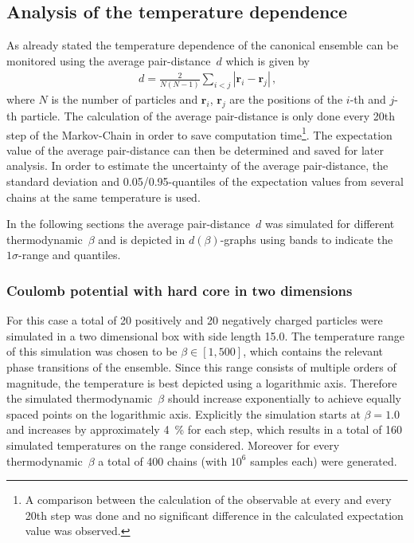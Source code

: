 \documentclass[11pt, a4paper]{article}
\numberwithin{equation}{section}
\begin{document}
\subsection{Analysis of the temperature dependence} \label{sec:Temp_Dep}
As already stated the temperature dependence of the canonical ensemble can be monitored using the average pair-distance~$d$ which is given by
\begin{align*}
d = \frac{2}{N(N - 1)} \sum_{i<j} |\mathbf{r}_i - \mathbf{r}_j | \, \text{,}
\end{align*}
where $N$ is the number of particles and $\mathbf{r}_i$, $\mathbf{r}_j$ are the positions of the $i$-th and $j$-th particle.
The calculation of the average pair-distance is only done every 20th step of the Markov-Chain in order to save computation time\footnote{A comparison between the calculation of the observable at every and every 20th step was done and no significant difference in the calculated expectation value was observed.}.
The expectation value of the average pair-distance can then be determined and saved for later analysis.
In order to estimate the uncertainty of the average pair-distance, the standard deviation and 0.05/0.95-quantiles of the expectation values from several chains at the same temperature is used.

In the following sections the average pair-distance~$d$ was simulated for different thermodynamic~$\beta$ and is depicted in $d(\beta)$-graphs using bands to indicate the $1\sigma$-range and quantiles.

\subsubsection{Coulomb potential with hard core in two dimensions} \label{sec:2d_coulomb_tempdep}
For this case a total of 20 positively and 20 negatively charged particles were simulated in a two dimensional box with side length 15.0.
The temperature range of this simulation was chosen to be $\beta \in [1, 500]$, which contains the relevant phase transitions of the ensemble.
Since this range consists of multiple orders of magnitude, the temperature is best depicted using a logarithmic axis.
Therefore the simulated thermodynamic~$\beta$ should increase exponentially to achieve equally spaced points on the logarithmic axis.
Explicitly the simulation starts at $\beta = 1.0$ and increases by approximately \SI{4}{\percent} for each step, which results in a total of 160 simulated temperatures on the range considered.
Moreover for every thermodynamic~$\beta$ a total of \num{400} chains (with $10^6$ samples each) were generated.
\end{document}
